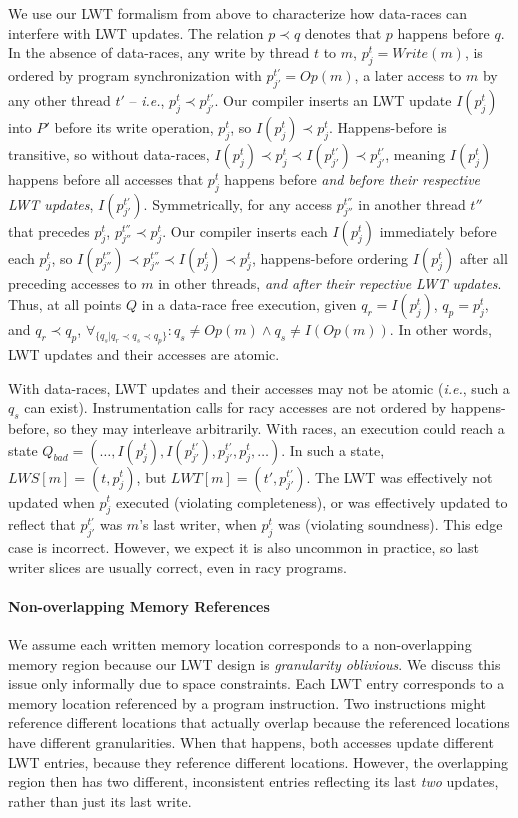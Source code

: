 \documentclass[preprint,9pt]{sigplanconf}
\newcommand{\lwt}{LWT\xspace}
\begin{document}
We use our \lwt formalism from above to characterize how data-races can
interfere with \lwt updates.  The relation $p \prec q$ denotes that $p$ happens
before $q$.  In the absence of data-races, any write by thread $t$ to $m$,
$p^{t}_{j} = Write(m)$, is ordered by program synchronization with $p^{t'}_{j'}
= Op(m)$, a later access to $m$ by any other thread $t'$ -- {\em i.e.},
$p^{t}_{j} \prec p^{t'}_{j'}$.  Our compiler inserts an \lwt update
$I(p^{t}_{j})$ into $P'$ before its write operation, $p^{t}_{j}$, so
$I(p^{t}_{j}) \prec p^{t}_{j}$.  Happens-before is transitive, so without
data-races, $I(p^{t}_{j}) \prec p^{t}_{j} \prec I(p^{t'}_{j'}) \prec
p^{t'}_{j'}$, meaning $I(p^{t}_{j})$ happens before all accesses that
$p^{t}_{j}$ happens before {\em and before their respective \lwt updates},
$I(p^{t'}_{j'})$.  Symmetrically, for any access $p^{t''}_{j''}$ in another
thread $t''$ that precedes $p^{t}_{j}$, $p^{t''}_{j''} \prec p^{t}_{j}$.  Our
compiler inserts each $I(p^{t}_{j})$ immediately before each $p^{t}_{j}$, so
$I(p^{t''}_{j''}) \prec p^{t''}_{j''} \prec I(p^{t}_{j}) \prec p^{t}_{j}$,
happens-before ordering $I(p^{t}_{j})$ after all preceding accesses to $m$ in
other threads, {\em and after their repective \lwt updates}.  Thus, at all
points $Q$ in a data-race free execution, given $q_r = I(p^{t}_{j})$, $q_p =
p^{t}_{j}$, and $q_r \prec q_p$, $\forall_{ \{q_s | q_r \prec q_s \prec q_p
\}}: q_s \ne Op(m) \wedge q_s \ne I(Op(m)) $.  In other words, \lwt updates and
their accesses are atomic.

With data-races, \lwt updates and their accesses may not be atomic ({\em i.e.},
such a $q_s$ can exist).  Instrumentation calls for racy accesses are not
ordered by happens-before, so they may interleave arbitrarily.  With races, an
execution could reach a state $Q_{bad} = (\ldots, I(p^{t}_{j}), I(p^{t'}_{j'}),
p^{t'}_{j'}, p^{t}_{j}, \ldots)$.  In such a state, $LWS[m] = (t,p^{t}_{j})$,
but $LWT[m] = (t',p^{t'}_{j'})$.  The \lwt was effectively not updated when
$p^{t}_{j}$ executed (violating completeness), or was effectively updated to
reflect that $p^{t'}_{j'}$ was $m$'s last writer, when $p^{t}_{j}$ was
(violating soundness).  This edge case is incorrect. However, we expect it is
also uncommon in practice, so last writer slices are usually correct, even in
racy programs.

\paragraph{Non-overlapping Memory References} 
We assume each written memory location corresponds to a non-overlapping memory
region because our \lwt design is {\em granularity oblivious}.  We discuss this
issue only informally due to space constraints.  Each \lwt entry corresponds to
a memory location referenced by a program instruction.  Two instructions might
reference different locations that actually overlap because the referenced
locations have different granularities.  When that happens, both accesses
update different \lwt entries, because they reference different locations.
However, the overlapping region then has two different, inconsistent entries
reflecting its last {\em two} updates, rather than just its last write.
\end{document}
